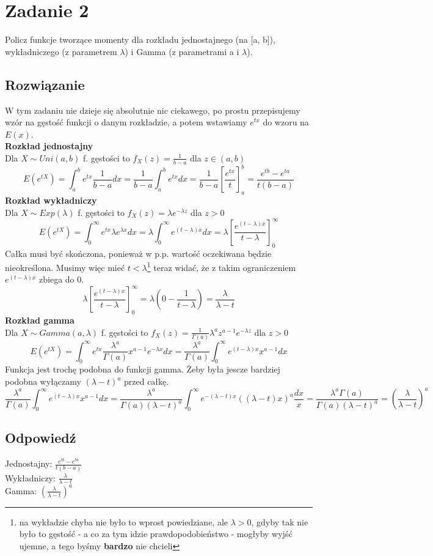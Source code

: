 \section{Zadanie 2}
Policz funkcje tworzące momenty dla rozkładu jednostajnego (na [a, b]), wykładniczego (z parametrem \(\lambda\)) i Gamma (z parametrami a i \(\lambda\)).

\subsection*{Rozwiązanie}
W tym zadaniu nie dzieje się absolutnie nic ciekawego, po prostu przepisujemy wzór na gęstość funkcji o danym rozkładzie, a potem wstawiamy \(e^{tx}\) do wzoru na \(E(x)\).\\
\textbf{Rozkład jednostajny}\\
Dla \(X \sim Uni(a,b)\) f. gęstości to \(f_X(z)=\frac{1}{b-a}\) dla \(z\in (a,b)\)
\[E(e^{tX})=\int_a^b e^{tx} \frac{1}{b-a} dx = \frac{1}{b-a}
	\int_a^b e^{tx} dx = \frac{1}{b-a} \left[\frac{e^{tx}}{t}\right]_a^b = \frac{e^{tb}-e^{ta}}{t(b-a)}\]
\textbf{Rozkład wykładniczy}\\
Dla \(X \sim Exp(\lambda)\) f. gęstości to \(f_X(z)=\lambda e^{-\lambda z}\) dla \(z>0\)
\[E(e^{tX})=\int_0^\infty e^{tx} \lambda e^{\lambda x} dx = \lambda\int_0^\infty e^{(t-\lambda)x} dx = \lambda \left[\frac{e^{(t-\lambda)x} }{t-\lambda }  \right]_0^\infty\]
Całka musi być skończona, ponieważ w p.p. wartość oczekiwana będzie nieokreślona. Musimy więc mieć \(t<\lambda\)\footnote{na wykładzie chyba nie było to wprost powiedziane, ale \(\lambda > 0\), gdyby tak nie było to gęstość - a co za tym idzie prawdopodobieństwo - mogłyby wyjść ujemne, a tego byśmy \textbf{bardzo} nie chcieli}
teraz widać, że z takim ograniczeniem \(e^{(t-\lambda)x}\) zbiega do 0.
\[ \lambda \left[\frac{e^{(t-\lambda)x} }{t-\lambda }  \right]_0^\infty= \lambda \left(0 - \frac{1}{t-\lambda}\right) = \frac{\lambda}{\lambda-t}\]
\textbf{Rozkład gamma}\\
Dla \(X \sim Gamma(a,\lambda)\) f. gęstości to \(f_X(z)=\frac{1}{\Gamma(a)} \lambda^a z^{a-1} e^{-\lambda z}\) dla \(z>0\) \\
\[E(e^{tX}) = \int_0^\infty e^{tx} \frac{\lambda^a}{\Gamma(a)} x^{a-1} e^{-\lambda x} dx = \frac{\lambda^a}{\Gamma(a)}
	\int_0^\infty e^{(t-\lambda)x} x^{a-1} dx\]
Funkcja jest trochę podobna do funkcji gamma. Żeby była jescze bardziej podobna wyłączamy \((\lambda-t)^a\) przed całkę.
\[\frac{\lambda^a}{\Gamma(a)}
	\int_0^\infty e^{(t-\lambda)x} x^{a-1} dx= \frac{\lambda^a}{\Gamma(a)(\lambda-t)^a}
	\int_0^\infty e^{-(\lambda-t)x} ((\lambda - t)x)^{a} \frac{dx}{x}=\frac{\lambda^a \Gamma(a)}{\Gamma(a)(\lambda-t)^a}=\left(\frac{\lambda}{\lambda-t}\right)^a\]

\subsection*{Odpowiedź}
Jednostajny: \(\frac{e^{tb}-e^{ta}}{t(b-a)}\)\\
Wykładniczy: \(\frac{\lambda}{\lambda-t}\)\\
Gamma: \(\left(\frac{\lambda}{\lambda-t}\right)^a\)
